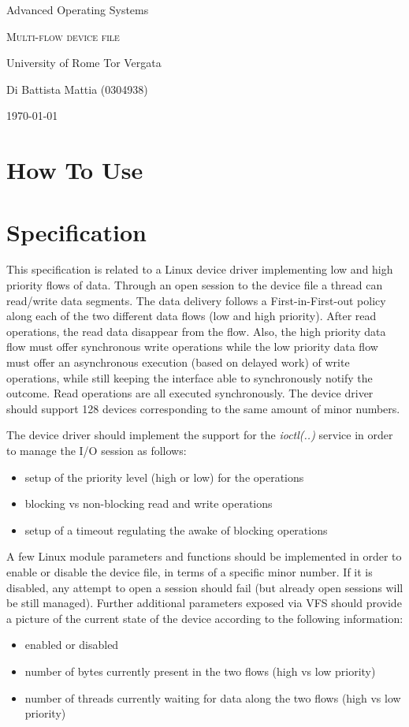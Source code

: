 \documentclass[12pt]{report}
\newcommand*{\myTitle}{\begingroup 
	\centering 
	\vspace*{\baselineskip} 
	
	
	{\LARGE Advanced Operating Systems}%
	\vspace*{1\baselineskip}
	
	\scshape %
	Multi-flow device file
	
	\vspace*{1\baselineskip}
	University of Rome Tor Vergata\\[\baselineskip]
	
	
	\vspace*{5\baselineskip} 
	
	{\large Di Battista Mattia (0304938)\par} 
	
	\vspace*{1\baselineskip}
	\today
	
	\endgroup\clearpage}
\begin{document}
\myTitle

\tableofcontents

\chapter{How To Use}
\chapter{Specification}

This specification is related to a Linux device driver implementing low and high priority flows of data.
Through an open session to the device file a thread can read/write data segments. The data delivery
follows a First-in-First-out policy along each of the two different data flows (low and high priority). After
read operations, the read data disappear from the flow. Also, the high priority data flow must offer
synchronous write operations while the low priority data flow must offer an asynchronous execution
(based on delayed work) of write operations, while still keeping the interface able to synchronously notify
the outcome. Read operations are all executed synchronously. The device driver should support 128
devices corresponding to the same amount of minor numbers.

The device driver should implement the support for the \emph{ioctl(..)} service in order to manage the I/O session
as follows:
\begin{itemize}
\item setup of the priority level (high or low) for the operations
\item blocking vs non-blocking read and write operations
\item setup of a timeout regulating the awake of blocking operations
\end{itemize}

A few Linux module parameters and functions should be implemented in order to enable or disable the
device file, in terms of a specific minor number. If it is disabled, any attempt to open a session should fail
(but already open sessions will be still managed). Further additional parameters exposed via VFS should
provide a picture of the current state of the device according to the following information:
\begin{itemize}
\item enabled or disabled
\item number of bytes currently present in the two flows (high vs low priority)
\item number of threads currently waiting for data along the two flows (high vs low priority)
\end{itemize}
\end{document}
